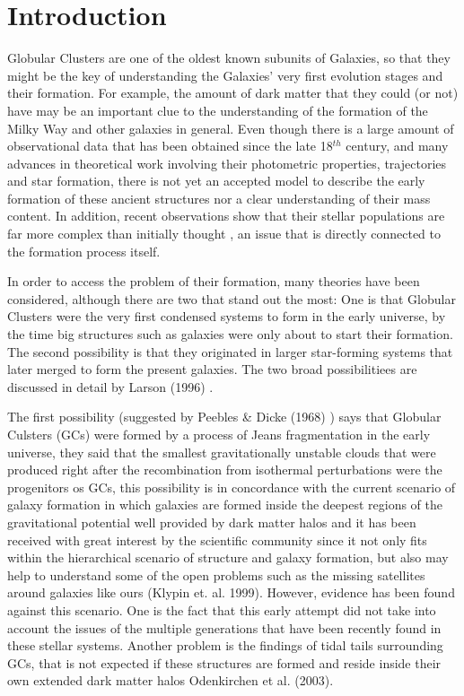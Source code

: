 \chapter{Introduction}

Globular Clusters are one of the oldest known subunits of Galaxies, so that they might be the key of understanding the Galaxies' very first evolution stages and their formation. For example, the amount of dark matter that they could (or not) have may be an important clue to the understanding of the formation of the Milky Way and other galaxies in general. Even though there is a large amount of observational data that has been obtained since the late 18$^{th}$ century, and many advances in theoretical work involving their photometric properties, trajectories and star formation, there is not yet an accepted model to describe the early formation of these ancient structures nor a clear understanding of their mass content. In addition, recent observations show that their stellar populations are far more complex than initially thought \cite{8}, an issue that is directly connected to the formation process itself. 

In order to access the problem of their formation, many theories have been considered, although there are two that stand out the most: One is that Globular Clusters were the very first condensed systems to form in the early universe, by the time big structures such as galaxies were only about to start their formation. The second possibility is that they originated in larger star-forming systems that later merged to form the present galaxies. The two broad possibilitiees are discussed in detail by Larson (1996) \cite{9}.

The first possibility (suggested by Peebles \& Dicke (1968) \citep{7}) says that Globular Culsters (GCs) were formed by a process of Jeans fragmentation in the early universe, they said that the smallest gravitationally unstable clouds that were produced right after the recombination from isothermal perturbations were the progenitors os GCs, this possibility is in concordance with the current scenario of galaxy formation in which galaxies are formed inside the deepest regions of the gravitational potential well provided by dark matter halos and it has been received with great interest by the scientific community since it not only fits within the hierarchical scenario of structure and galaxy formation, but also may help to understand some of the open problems such as the missing satellites around galaxies like ours (Klypin et. al. 1999). However, evidence has been found against this scenario. One is the fact that this early attempt did not take into account the issues of the multiple generations that have been recently found in these stellar systems. Another problem is the findings of tidal tails surrounding GCs, that is not expected if these structures are formed and reside inside their own extended dark matter halos Odenkirchen et al. (2003).

